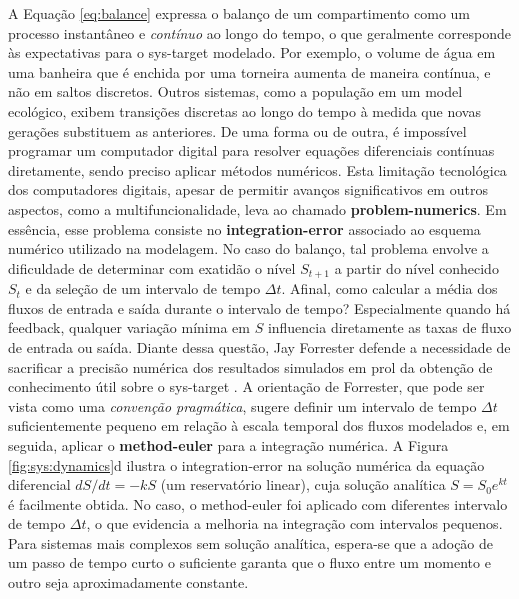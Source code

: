 \documentclass[./main.tex]{subfiles}
\begin{document}
\par A Equação \eqref{eq:balance} expressa o balanço de um compartimento como um processo instantâneo e \textit{contínuo} ao longo do tempo, o que geralmente corresponde às expectativas para o \gls{sys-target} modelado. Por exemplo, o volume de água em uma banheira que é enchida por uma torneira aumenta de maneira contínua, e não em saltos discretos. Outros sistemas, como a população em um \gls{model} ecológico, exibem transições discretas ao longo do tempo à medida que novas gerações substituem as anteriores. De uma forma ou de outra, é impossível programar um computador digital para resolver equações diferenciais contínuas diretamente, sendo preciso aplicar métodos numéricos. Esta limitação tecnológica dos computadores digitais, apesar de permitir avanços significativos em outros aspectos, como a multifuncionalidade, leva ao chamado \textbf{\gls{problem-numerics}}. Em essência, esse problema consiste no \textbf{\gls{integration-error}} associado ao esquema numérico utilizado na modelagem. No caso do balanço, tal problema envolve a dificuldade de determinar com exatidão o nível $S_{t+1}$ a partir do nível conhecido $S_t$ e da seleção de um intervalo de tempo $\Delta t$. Afinal, como calcular a média dos fluxos de entrada e saída durante o intervalo de tempo? Especialmente quando há \gls{feedback}, qualquer variação mínima em $S$ influencia diretamente as taxas de fluxo de entrada ou saída. Diante dessa questão, Jay Forrester defende a necessidade de sacrificar a precisão numérica dos resultados simulados em prol da obtenção de conhecimento útil sobre o \gls{sys-target} \cite{forrester1964}. A orientação de Forrester, que pode ser vista como uma \textit{convenção pragmática}, sugere definir um intervalo de tempo $\Delta t$ suficientemente pequeno em relação à escala temporal dos fluxos modelados e, em seguida, aplicar o \textbf{\gls{method-euler}} para a integração numérica. A Figura \ref{fig:sys:dynamics}d ilustra o \gls{integration-error} na solução numérica da equação diferencial $dS/dt = -kS$ (um reservatório linear), cuja solução analítica $S = S_0e^{kt}$ é facilmente obtida. No caso, o \gls{method-euler} foi aplicado com diferentes intervalo de tempo $\Delta t$, o que evidencia a melhoria na integração com intervalos pequenos. Para sistemas mais complexos sem solução analítica, espera-se que a adoção de um passo de tempo curto o suficiente garanta que o fluxo entre um momento e outro seja aproximadamente constante. 
\end{document}
